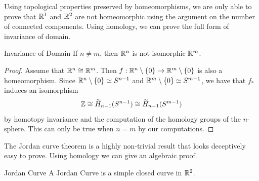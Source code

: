 \documentclass[a4paper]{article}
\begin{document}
Using topological properties preserved by homeomorphisms, we are only able to prove that $\mathbb{R}^1$ and $\mathbb{R}^2$ are not homeomorphic using the argument on the number of connected components. Using homology, we can prove the full form of invariance of domain. 

\begin{crl}{Invariance of Domain}{} If $n\neq m$, then $\mathbb{R}^n$ is not isomorphic $\mathbb{R}^m$. \tcbline
\begin{proof}
Assume that $\mathbb{R}^n\cong\mathbb{R}^m$. Then $f:\mathbb{R}^n\setminus\{0\}\to\mathbb{R}^m\setminus\{0\}$ is also a homeomorphism. Since $\mathbb{R}^n\setminus\{0\}\simeq S^{n-1}$ and $\mathbb{R}^m\setminus\{0\}\simeq S^{m-1}$, we have that $f_\ast$ induces an isomorphism $$\mathbb{Z}\cong\widetilde{H}_{n-1}(S^{n-1})\cong\widetilde{H}_{n-1}(S^{m-1})$$ by homotopy invariance and the computation of the homology groups of the $n$-sphere. This can only be true when $n=m$ by our computations. 
\end{proof}
\end{crl}

The Jordan curve theorem is a highly non-trivial result that looks deceptively easy to prove. Using homology we can give an algebraic proof. 

\begin{defn}{Jordan Curve}{} A Jordan Curve is a simple closed curve in $\mathbb{R}^2$. 
\end{defn}
\end{document}
